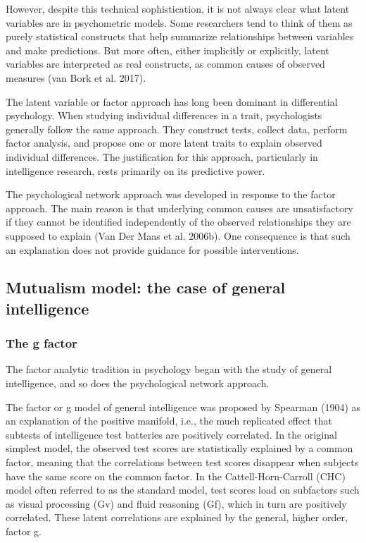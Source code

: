 \documentclass[
  letterpaper,
]{scrbook}
\begin{document}
However, despite this technical sophistication, it is not always clear
what latent variables are in psychometric models. Some researchers tend
to think of them as purely statistical constructs that help summarize
relationships between variables and make predictions. But more often,
either implicitly or explicitly, latent variables are interpreted as
real constructs, as common causes of observed measures (van Bork et al.
2017).

The latent variable or factor approach has long been dominant in
differential psychology. When studying individual differences in a
trait, psychologists generally follow the same approach. They construct
tests, collect data, perform factor analysis, and propose one or more
latent traits to explain observed individual differences. The
justification for this approach, particularly in intelligence research,
rests primarily on its predictive power.

The psychological network approach was developed in response to the
factor approach. The main reason is that underlying common causes are
unsatisfactory if they cannot be identified independently of the
observed relationships they are supposed to explain (Van Der Maas et al.
2006b). One consequence is that such an explanation does not provide
guidance for possible interventions.

\hypertarget{mutualism-model-the-case-of-general-intelligence}{%
\subsection{Mutualism model: the case of general
intelligence}\label{mutualism-model-the-case-of-general-intelligence}}

\hypertarget{the-g-factor}{%
\subsubsection{The g factor}\label{the-g-factor}}

The factor analytic tradition in psychology began with the study of
general intelligence, and so does the psychological network approach.

The factor or g model of general intelligence was proposed by Spearman
(1904) as an explanation of the positive manifold, i.e., the much
replicated effect that subtests of intelligence test batteries are
positively correlated. In the original simplest model, the observed test
scores are statistically explained by a common factor, meaning that the
correlations between test scores disappear when subjects have the same
score on the common factor. In the Cattell-Horn-Carroll (CHC) model
often referred to as the standard model, test scores load on subfactors
such as visual processing (Gv) and fluid reasoning (Gf), which in turn
are positively correlated. These latent correlations are explained by
the general, higher order, factor g.
\end{document}
